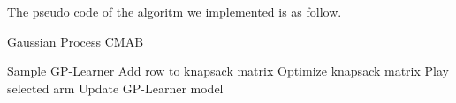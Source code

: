 The pseudo code of the algoritm we implemented is as follow.
\begin{algorithm}
	\caption{Gaussian Process CMAB}
	\begin{algorithmic}[1]
		\STATE Sample GP-Learner
		\STATE Add row to knapsack matrix
		\ENDFOR
		\STATE Optimize knapsack matrix
		\STATE Play selected arm
		\STATE Update GP-Learner model
	\end{algorithmic}
\end{algorithm}